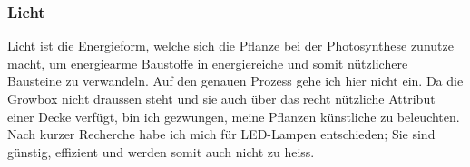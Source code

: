 \documentclass[12pt,titlepage,a4paper]{article}
\begin{document}
\subsubsection{Licht}
Licht ist die Energieform, welche sich die Pflanze bei der Photosynthese zunutze macht, um energiearme Baustoffe in energiereiche und somit nützlichere Bausteine zu verwandeln. Auf den genauen Prozess gehe ich hier nicht ein. Da die Growbox nicht draussen steht und sie auch über das recht nützliche Attribut einer Decke verfügt, bin ich gezwungen, meine Pflanzen künstliche zu beleuchten. Nach kurzer Recherche habe ich mich für LED-Lampen entschieden; Sie sind günstig, effizient und werden somit auch nicht zu heiss.\\ 


%

\end{document}
